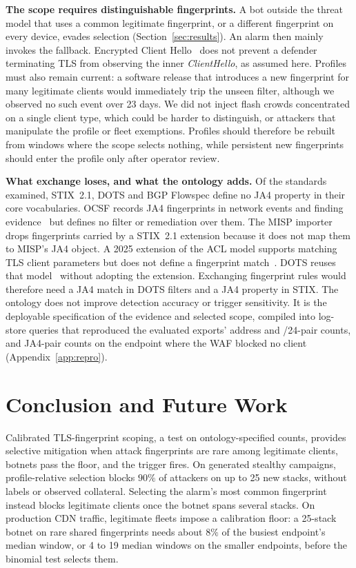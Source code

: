 \documentclass[conference,letterpaper,10pt]{IEEEtran}
\newcommand\1{\textit{(i)}}
\newcommand\2{\textit{(ii)}}
\newcommand\3{\textit{(iii)}}
\newcommand\4{\textit{(iv)}}
\newcommand\5{\textit{(v)}}
\newcommand\6{\textit{(vi)}}
\newcommand\7{\textit{(vii)}}
\newcommand\8{\textit{(viii)}}
\newcommand\9{\textit{(ix)}}
\begin{document}
\textbf{The scope requires distinguishable fingerprints.}
A bot outside the threat model that uses
a common legitimate fingerprint, or a
different fingerprint on every device,
evades selection (Section~\ref{sec:results}).
An alarm then mainly invokes the fallback. Encrypted Client
Hello~\cite{ietf2026ech} does not prevent
a defender terminating TLS from observing
the inner \textit{ClientHello}, as assumed
here. Profiles must also remain current:
a software release that introduces a new
fingerprint for many legitimate clients
would immediately trip the unseen filter, although
we observed no such event over 23 days.
We did not inject flash crowds concentrated
on a single client type, which could be
harder to distinguish, or attackers that
manipulate the profile or fleet exemptions.
Profiles should therefore be rebuilt from windows where the
scope selects nothing, while
persistent new fingerprints should enter
the profile only after operator review.

\textbf{What exchange loses, and what the ontology adds.}
Of the standards examined, STIX~2.1, DOTS and BGP Flowspec
define no JA4 property in their core vocabularies.
OCSF records JA4 fingerprints in network
events and finding evidence~\cite{ocsf2025schema} but
defines no filter or remediation over them. The MISP
importer
drops fingerprints carried by a STIX~2.1
extension because it does not map them
to MISP's JA4 object. A 2025 extension
of the ACL model supports matching TLS
client parameters but does not define
a fingerprint match~\cite{ietf2025mudtls}.
DOTS reuses that model~\cite{dots2020data} without adopting
the extension. Exchanging fingerprint rules would therefore
need a JA4 match in DOTS filters and a JA4
property in STIX. The ontology does not
improve detection accuracy or trigger
sensitivity. It is the deployable specification of the
evidence and selected scope, compiled into log-store queries
that reproduced the
evaluated exports' address and /24-pair
counts, and JA4-pair counts on the endpoint where the WAF
blocked no client
(Appendix~\ref{app:repro}).

\section{Conclusion and Future Work}
\label{sec:conclusion}

Calibrated TLS-fingerprint scoping, a test on
ontology-specified counts, provides selective mitigation
when attack fingerprints are rare among
legitimate clients, botnets pass the floor, and the trigger
fires. On generated stealthy campaigns,
profile-relative selection blocks $90\%$ of attackers on up
to 25 new stacks, without labels or observed collateral.
Selecting the alarm's most common fingerprint instead blocks
legitimate clients once
the botnet spans several stacks. On production CDN traffic,
legitimate fleets impose a calibration floor:
a 25-stack botnet on rare shared fingerprints needs about
$8\%$ of the busiest endpoint's median window,
or 4 to 19 median windows on the smaller endpoints, before
the binomial test selects them.
\end{document}

